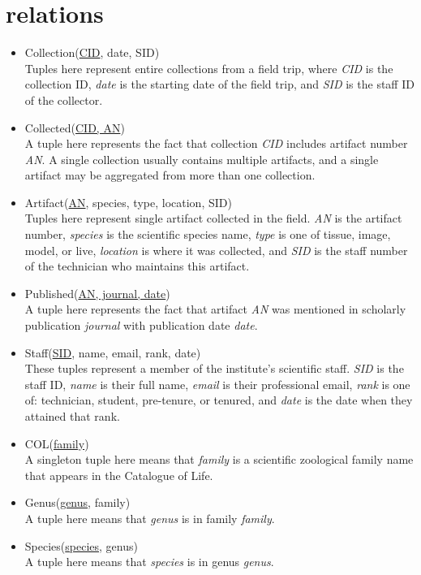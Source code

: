 \documentclass[boldsans]{article}
\begin{document}
\section*{relations}
\begin{itemize}
\item Collection(\underline{CID}, date, SID)\\
  Tuples here represent entire collections from a field trip, where
  \textit{CID} is the collection ID, \textit{date} is the starting
  date of the field trip, and \textit{SID} is the staff ID of the
  collector.

\item Collected(\underline{CID, AN})\\
  A tuple here represents the fact that collection \textit{CID}
  includes artifact number \textit{AN}.  A single collection usually
  contains multiple artifacts, and a single artifact may be aggregated
  from more than one collection.

\item Artifact(\underline{AN}, species, type, location, SID)\\
  Tuples here represent single artifact collected in the field.
  \textit{AN} is the artifact number, \textit{species} is the scientific species
  name, \textit{type} is one of tissue, image, model, or live,
  \textit{location} is where it was collected, and \textit{SID} is the
  staff number of the technician who maintains this artifact.

\item Published(\underline{AN, journal, date})\\
  A tuple here represents the fact that artifact \textit{AN} was
  mentioned in scholarly publication \textit{journal} with publication
  date \textit{date}.

\item Staff(\underline{SID}, name, email, rank, date)\\
  These tuples represent a member of the institute's scientific staff.
  \textit{SID} is the staff ID, \textit{name} is their full name,
  \textit{email} is their professional email, \textit{rank} is one of:
  technician, student, pre-tenure, or tenured, and
  \textit{date} is the date when they attained that rank.

\item COL(\underline{family})\\
  A singleton tuple here means that \textit{family} is a scientific
  zoological family name that appears in the Catalogue of  Life.

\item Genus(\underline{genus}, family)\\
  A tuple here means that \textit{genus} is in family \textit{family}.

\item Species(\underline{species}, genus)\\
  A tuple here means that \textit{species} is in genus \textit{genus}.
\end{itemize}
\end{document}
